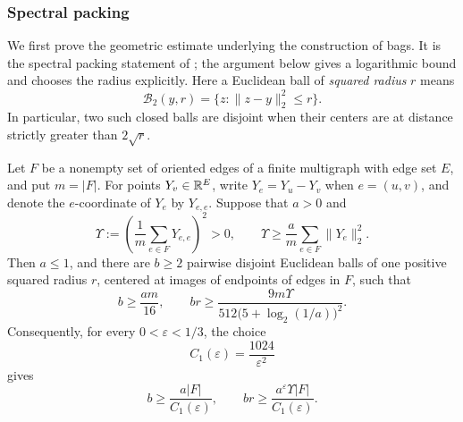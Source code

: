\subsubsection{Spectral packing}
\label{hb:spectral-subsection}

We first prove the geometric estimate underlying the construction of
bags.  It is the spectral packing statement of
\cite[Lemma~6.4]{AOG}; the argument below gives a logarithmic bound and
chooses the radius explicitly.
Here a Euclidean ball of \emph{squared radius} \(r\) means
\[
 \mathcal B_2(y,r)=\{z:\|z-y\|_2^2\le r\}.
\]
In particular, two such closed balls are disjoint when their centers
are at distance strictly greater than \(2\sqrt r\).

\begin{lemma}\label{hb:spectral-packing}
Let \(F\) be a nonempty set of oriented edges of a finite multigraph
with edge set \(E\), and put \(m=|F|\).
For points \(Y_v\in\mathbb R^E\), write
\(Y_e=Y_u-Y_v\) when \(e=(u,v)\), and denote the \(e\)-coordinate of
\(Y_e\) by \(Y_{e,e}\).
Suppose that \(a>0\) and
\begin{equation}\label{hb:spectral-assumption}
 \Upsilon:=\left(\frac1m\sum_{e\in F}Y_{e,e}\right)^2>0,
 \qquad
 \Upsilon\ge\frac a m\sum_{e\in F}\|Y_e\|_2^2.
\end{equation}
Then \(a\le1\), and there are \(b\ge2\) pairwise disjoint Euclidean
balls of one positive squared radius \(r\), centered at images of
endpoints of edges in \(F\), such that
\begin{equation}\label{hb:spectral-logarithmic}
 b\ge\frac{am}{16},
 \qquad
 br\ge\frac{9m\Upsilon}
 {512\bigl(5+\log_2(1/a)\bigr)^2}.
\end{equation}
Consequently, for every \(0<\varepsilon<1/3\), the choice
\begin{equation}\label{hb:spectral-constant}
 C_1(\varepsilon)=\frac{1024}{\varepsilon^2}
\end{equation}
gives
\begin{equation}\label{hb:spectral-conclusion}
 b\ge\frac{a|F|}{C_1(\varepsilon)},
 \qquad
 br\ge\frac{a^\varepsilon\Upsilon|F|}{C_1(\varepsilon)}.
\end{equation}
\end{lemma}

